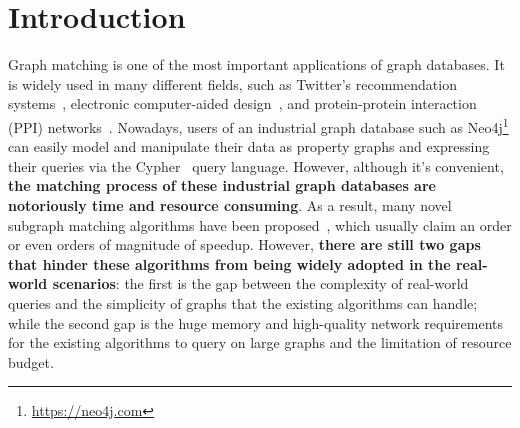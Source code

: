 \section{Introduction}
Graph matching is one of the most important applications of graph databases.
It is widely used in many different fields,
such as Twitter's recommendation systems~\cite{DBLP:journals/pvldb/GuptaSGGZLL14,DBLP:journals/pvldb/SharmaJBLL16},
electronic computer-aided design~\cite{DBLP:conf/dac/OhlrichEGS93},
and protein-protein interaction (PPI) networks~\cite{milenkovic2008uncovering}.
Nowadays, users of an industrial graph database such as Neo4j\footnote{\url{https://neo4j.com}}
can easily model and manipulate their data as property graphs and expressing their queries via the Cypher~\cite{DBLP:conf/sigmod/FrancisGGLLMPRS18} query language.
However, although it's convenient, \textbf{the matching process of these industrial graph databases are notoriously time and resource consuming}.
As a result, many novel subgraph matching algorithms have been proposed~\cite{DBLP:journals/pvldb/SunWWSL12,DBLP:conf/sigmod/HanLL13,DBLP:conf/sigmod/ShaoCCMYX14,DBLP:conf/cloud/SerafiniMS17,DBLP:journals/pvldb/QiaoZC17,DBLP:conf/sigmod/DiasTGM019},
which usually claim an order or even orders of magnitude of speedup.
However, \textbf{there are still two gaps that hinder these algorithms from being widely adopted in the real-world scenarios}:
the first is the gap between the complexity of real-world queries and the simplicity of graphs that the existing algorithms can handle;
while the second gap is the huge memory and high-quality network requirements for the existing algorithms to query on large graphs and the limitation of resource budget.

